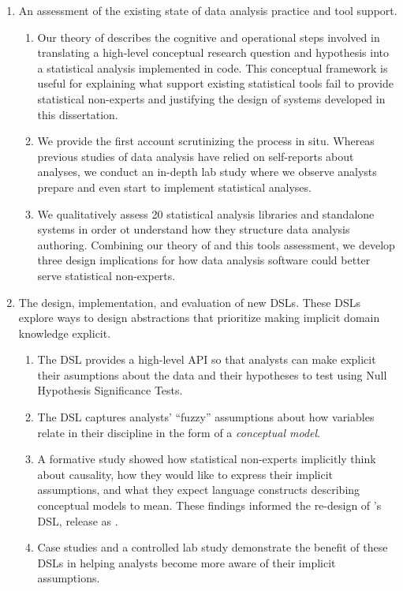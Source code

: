 \begin{enumerate} 
    \item An assessment of the existing state of data analysis practice and tool support.
    \begin{enumerate}
        \item Our theory of \hypoForm describes the cognitive and operational
        steps involved in translating a high-level conceptual research question
        and hypothesis into a statistical analysis implemented in code. This
        conceptual framework is useful for explaining what support existing
        statistical tools fail to provide statistical non-experts and justifying
        the design of systems developed in this dissertation.
        \item We provide the first account scrutinizing the \hypoForm process in
        situ. Whereas previous studies of data analysis have relied on
        self-reports about analyses, we conduct an in-depth lab study where we
        observe analysts prepare and even start to implement statistical
        analyses. 
        \item We qualitatively assess 20 statistical analysis libraries and
        standalone systems in order ot understand how they structure data
        analysis authoring. Combining our theory of \hypoForm and this tools
        assessment, we develop three design implications for how data analysis
        software could better serve statistical non-experts. 
    \end{enumerate}

    \item The design, implementation, and evaluation of new DSLs. These DSLs
    explore ways to design abstractions that prioritize making implicit domain
    knowledge explicit. 
    \begin{enumerate}
        \item The \tea DSL provides a high-level API so that analysts can make
        explicit their asumptions about the data and their hypotheses to test
        using Null Hypothesis Significance Tests. 
        \item The \tisane DSL captures analysts' ``fuzzy'' assumptions about how
        variables relate in their discipline in the form of a \textit{conceptual
        model}.
        \item A formative study showed how statistical non-experts implicitly
        think about causality, how they would like to express their implicit
        assumptions, and what they expect language constructs describing
        conceptual models to mean. These findings informed the re-design of
        \tisane's DSL, release as \rTisane.
        \item Case studies and a controlled lab study demonstrate the benefit of
        these DSLs in helping analysts become more aware of their implicit
        assumptions. 
    \end{enumerate}


\end{enumerate}
